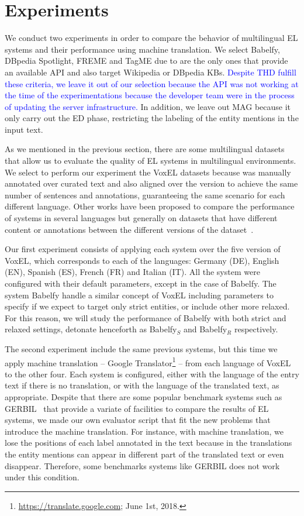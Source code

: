 \documentclass{llncs}
\begin{document}
\section{Experiments}

We conduct two experiments in order to compare the behavior of multilingual EL systems and their performance using machine translation. We select Babelfy, DBpedia Spotlight, FREME and TagME due to are the only ones that provide an available API and also target Wikipedia or DBpedia KBs. \textcolor{blue}{Despite THD fulfill these criteria, we leave it out of our selection because the API was not working at the time of the experimentations because the developer team were in the process of updating the server infrastructure.} In addition, we leave out MAG because it only carry out the ED phase, restricting the labeling of the entity mentions in the input text.

As we mentioned in the previous section, there are some multilingual datasets that allow us to evaluate the quality of EL systems in multilingual environments. We select to perform our experiment the VoxEL datasets because was manually annotated over curated text and also aligned over the version to achieve the same number of sentences and annotations, guaranteeing the same scenario for each different language. Other works have been proposed to compare the performance of systems in several languages but generally on datasets that have different content or annotations between the different versions of the dataset~\cite{ourLD4ID2017}.

Our first experiment consists of applying each system over the five version of VoxEL, which corresponds to each of the languages: Germany (DE), English (EN), Spanish (ES), French (FR) and Italian (IT). All the system were configured with their default parameters, except in the case of Babelfy. The system Babelfy handle a similar concept of VoxEL including parameters to specify if we expect to target only strict entities, or include other more relaxed. For this reason, we will study the performance of Babelfy with both strict and relaxed settings, detonate henceforth as Babelfy$_S$ and Babelfy$_R$ respectively.

The second experiment include the same previous systems, but this time we apply machine translation -- Google Translator\footnote{\url{https://translate.google.com}; June 1st, 2018.} -- from each language of VoxEL to the other four. Each system is configured, either with the language of the entry text if there is no translation, or with the language of the translated text, as appropriate. Despite that there are some popular benchmark systems such as GERBIL~\cite{gerbil2015} that provide a variate of facilities to compare the results of EL systems, we made our own evaluator script that fit the new problems that introduce the machine translation. For instance, with machine translation, we lose the positions of each label annotated in the text because in the translations the entity mentions can appear in different part of the translated text or even disappear. Therefore, some benchmarks systems like GERBIL does not work under this condition. 
\end{document}
